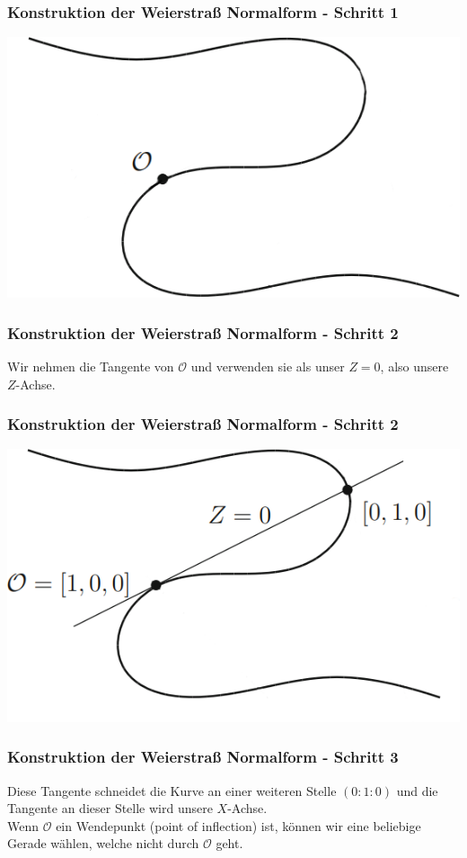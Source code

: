 \documentclass{beamer}
\begin{document}
\begin{frame}
\frametitle{Konstruktion der Weierstraß Normalform - Schritt 1}
    \begin{center}
    \includegraphics[scale=2]{images/WNF_Konstruktion_1.png}
    \end{center}
\end{frame}

\begin{frame}
\frametitle{Konstruktion der Weierstraß Normalform - Schritt 2}
	Wir nehmen die Tangente von \(\mathcal{O}\) und verwenden
	sie als unser \(Z=0\), also unsere \(Z\)-Achse.
\end{frame}

\begin{frame}
\frametitle{Konstruktion der Weierstraß Normalform - Schritt 2}
    \begin{center}
    \includegraphics[scale=2]{images/WNF_Konstruktion_2.png}
    \end{center}
\end{frame}

\begin{frame}
\frametitle{Konstruktion der Weierstraß Normalform - Schritt 3}
	Diese Tangente schneidet die Kurve an einer weiteren Stelle
	\((0:1:0)\) und die Tangente an dieser Stelle wird unsere
	\(X\)-Achse.
	\\
	Wenn \(\mathcal{O}\) ein Wendepunkt (point of inflection) ist,
	können wir eine beliebige Gerade wählen, welche nicht durch
	\(\mathcal{O}\) geht.
\end{frame}
\end{document}
